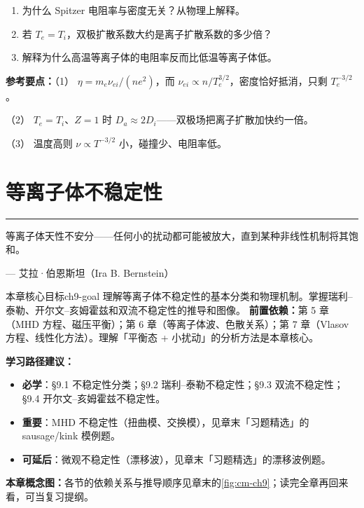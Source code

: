 \documentclass[12pt,a4paper,openany,oneside]{book}
\let\plainepigraph\epigraph
\renewcommand{\epigraph}[2]{%
  \par\addvspace{1.5pt}\noindent\hfill{\color{figAmber!75}\rule{2.8cm}{0.6pt}}\par
  \vspace{0.6pt}\plainepigraph{#1}{#2}}
\newcommand{\quizans}[1]{\par\medskip{\color{figGray}\rule{\linewidth}{0.3pt}}\par\smallskip
  {\footnotesize\textbf{参考要点：}#1}}
\begin{document}
\begin{miniquiz}
\begin{enumerate}
\item 为什么 Spitzer 电阻率与密度无关？从物理上解释。
\item 若 $T_e = T_i$，双极扩散系数大约是离子扩散系数的多少倍？
\item 解释为什么高温等离子体的电阻率反而比低温等离子体低。
\end{enumerate}
\quizans{（1） $\eta=m_e\nu_{ei}/(ne^2)$，而 $\nu_{ei}\propto n/T_e^{3/2}$，密度恰好抵消，只剩 $T_e^{-3/2}$。\par （2） $T_e=T_i$、$Z=1$ 时 $D_a\approx2D_i$——双极场把离子扩散加快约一倍。\par （3） 温度高则 $\nu\propto T^{-3/2}$ 小，碰撞少、电阻率低。}
\end{miniquiz}




\chapter{等离子体不稳定性}\label{ch:9}
\epigraph{等离子体天性不安分——任何小的扰动都可能被放大，直到某种非线性机制将其饱和。}{--- 艾拉·伯恩斯坦（Ira B. Bernstein）}

\begin{insight}{本章核心目标}{ch9-goal}
理解等离子体不稳定性的基本分类和物理机制。掌握瑞利--泰勒、开尔文--亥姆霍兹和双流不稳定性的推导和图像。
\tcblower
\textbf{前置依赖：}第 5 章（MHD 方程、磁压平衡）；第 6 章（等离子体波、色散关系）；第 7 章（Vlasov 方程、线性化方法）。理解「平衡态 + 小扰动」的分析方法是本章核心。

\textbf{学习路径建议：}

\begin{itemize}[leftmargin=*]
\item[\textcolor{red}{$\blacksquare$}] \textbf{必学}：\S 9.1 不稳定性分类；\S 9.2 瑞利--泰勒不稳定性；\S 9.3 双流不稳定性；\S 9.4 开尔文--亥姆霍兹不稳定性。
\item[\textcolor{orange}{$\blacksquare$}] \textbf{重要}：MHD 不稳定性（扭曲模、交换模），见章末「习题精选」的 sausage/kink 模例题。
\item[\textcolor{green}{$\blacksquare$}] \textbf{可延后}：微观不稳定性（漂移波），见章末「习题精选」的漂移波例题。
\end{itemize}
\textbf{本章概念图：}各节的依赖关系与推导顺序见章末的\cref{fig:cm-ch9}；读完全章再回来看，可当复习提纲。
\end{insight}
\end{document}
